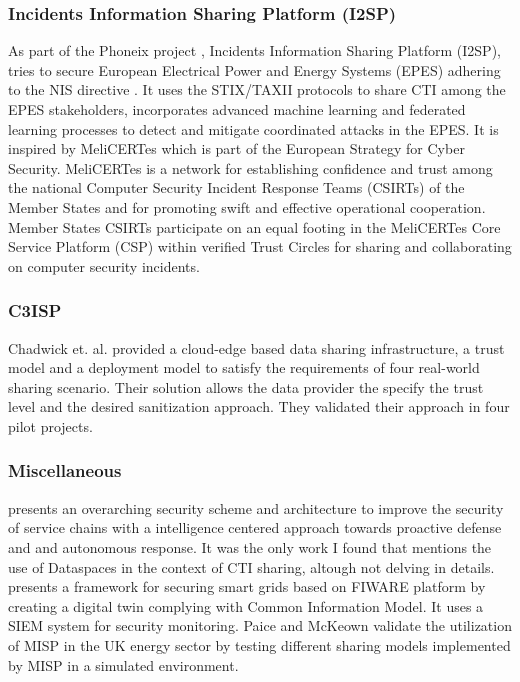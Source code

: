 \subsubsection{Incidents Information Sharing Platform (I2SP)} 
As part of the Phoneix project \cite{phoenix}, Incidents Information Sharing Platform (I2SP), tries to secure European Electrical Power and Energy Systems (EPES) adhering to the NIS directive \cite{skias_pan-european_2021}. It uses the STIX/TAXII protocols to share CTI among the EPES stakeholders, incorporates advanced machine learning and federated learning processes to detect and mitigate coordinated attacks in the EPES. It is inspired by MeliCERTes \cite{noauthor_melicertescsp_2024} which is part of the European Strategy for Cyber Security.  MeliCERTes is a network for establishing confidence and trust among the national Computer Security Incident Response Teams (CSIRTs) of the Member States and for promoting swift and effective operational cooperation. Member States CSIRTs participate on an equal footing in the MeliCERTes Core Service Platform (CSP) within verified Trust Circles for sharing and collaborating on computer security incidents. \cite{noauthor_melicertescsp_2024}
\subsubsection{C3ISP} Chadwick et. al. \cite{chadwick_cloud-edge_2020} provided a cloud-edge based data sharing infrastructure, a trust model and a deployment model to satisfy the requirements of four real-world sharing scenario. Their solution allows the data provider the specify the trust level and the desired sanitization approach. They validated their approach in four pilot projects.
\subsubsection{Miscellaneous}
\cite{repetto_adaptive_2023} presents an overarching security scheme and architecture to improve the security of service chains with a intelligence centered approach towards proactive defense and and autonomous response. It was the only work I found that mentions the use of Dataspaces in the context of CTI sharing, altough not delving in details. \cite{coppolino_building_2023} presents a framework for securing smart grids based on FIWARE platform by creating a digital twin complying with Common Information Model. It uses a SIEM system for security monitoring.
Paice and McKeown \cite{paice_practical_2023} validate the utilization of MISP in the UK energy sector by testing different sharing models implemented by MISP in a simulated environment. 
